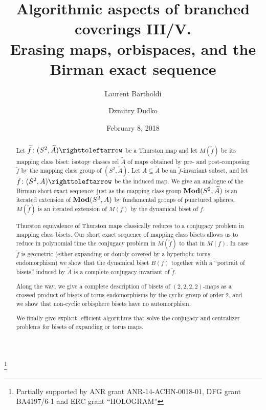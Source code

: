 \documentclass{amsart}
\newcommand\wtf{{\widetilde f}}
\newcommand\wtA{{\widetilde A}}
\begin{document}
\title[Erasing maps, orbispaces, and the Birman exact sequence]{Algorithmic aspects of branched coverings III/V.\\ Erasing maps, orbispaces, and the Birman exact sequence}
\author{Laurent Bartholdi}
\address{\'Ecole Normale Sup\'erieure, Paris \emph{and} Mathematisches Institut, Georg-August Universit\"at zu G\"ottingen}
\author{Dzmitry Dudko}
\address{Jacobs University, Bremen}
\thanks{Partially supported by ANR grant ANR-14-ACHN-0018-01, DFG grant BA4197/6-1 and ERC grant ``HOLOGRAM''}
\date{February 8, 2018}
\begin{abstract}
  Let $\wtf\colon(S^2,\wtA)\selfmap$ be a Thurston map and let
  $M(\wtf)$ be its mapping class biset: isotopy classes rel
  $\wtA$ of maps obtained by pre- and post-composing $\wtf$ by
  the mapping class group of $(S^2,\wtA)$. Let
  $A\subseteq\wtA$ be an $\wtf$-invariant subset, and let
  $f\colon(S^2,A)\selfmap$ be the induced map. We give an analogue of
  the Birman short exact sequence: just as the mapping class group $\Mod(S^2,\wtA)$ is
  an iterated extension of $\mathbf{\relax Mod}(S^2,A)$ by fundamental groups of
  punctured spheres, $M(\wtf)$ is an iterated extension of $M(f)$ by
  the dynamical biset of $f$.

  Thurston equivalence of Thurston maps classically reduces to a
  conjugacy problem in mapping class bisets.  Our short exact sequence
  of mapping class bisets allows us to reduce in polynomial time the
  conjugacy problem in $M(\wtf)$ to that in $M(f)$.  In case $\wtf$ is
  geometric (either expanding or doubly covered by a hyperbolic torus
  endomorphism) we show that the dynamical biset $B(f)$ together with
  a ``portrait of bisets'' induced by $\wtA$ is a complete conjugacy
  invariant of $\wtf$.

  Along the way, we give a complete description of bisets of
  $(2,2,2,2)$-maps as a crossed product of bisets of torus
  endomorphisms by the cyclic group of order $2$, and we show that
  non-cyclic orbisphere bisets have no automorphism.

  We finally give explicit, efficient algorithms that solve the
  conjugacy and centralizer problems for bisets of expanding or torus
  maps.
\end{abstract}
\maketitle

\end{document}

